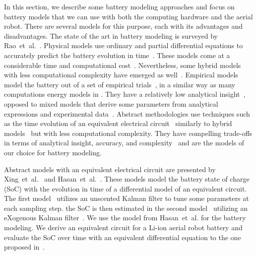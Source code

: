 In this section, we describe some battery modeling approaches and focus on battery models that we can use with both the computing hardware and the aerial robot. There are several models for this purpose, each with its advantages and disadvantages. The state of the art in battery modeling is surveyed by Rao~et~al.~\citep{rao2003battery}.
Physical models use ordinary and partial differential equations to accurately predict the battery evolution in time~\citep{rao2003battery}. These models come at a considerable time and computational cost~\citep{doyle1993modeling,marcicki2013design,lotfi2017reduced,moura2017battery}. Nevertheless, some hybrid models with less computational complexity have emerged as well~\citep{kim2011hybrid,kim2019enhanced}. Empirical models model the battery out of a set of empirical trials~\citep{syracuse1997statistical,pedram1999design}, in a similar way as many computations energy models in . They have a relatively low analytical insight~\citep{rao2003battery}, opposed to mixed models that derive some parameters from analytical expressions and experimental data~\citep{rao2003battery,rakhmatov2001analytical}. Abstract methodologies use techniques such as the time evolution of an equivalent electrical circuit~\citep{gold1997pspice,benini2001discrete,seongjun2008state,xiaosong2012comparative,xing2014state,hasan2018exogenous} similarly to hybrid models~\citep{kim2011hybrid} but with less computational complexity. They have compelling trade-offs in terms of analytical insight, accuracy, and complexity~\citep{rao2003battery} and are the models of our choice for battery modeling.

Abstract models with an equivalent electrical circuit are presented by Xing~et~al.~\citep{xing2014state} and Hasan~et~al.~\citep{hasan2018exogenous}. These models model the battery state of charge (SoC) with the evolution in time of a differential model of an equivalent circuit. The first model~\citep{xing2014state} utilizes an unscented Kalman filter to tune some parameters at each sampling step. the SoC is then estimated in the second model~\citep{hasan2018exogenous} utilizing an eXogenous Kalman filter~\citep{johansen2017exogenous}. We use the model from Hasan~et~al. for the battery modeling. We derive an equivalent circuit for a Li-ion aerial robot battery and evaluate the SoC over time with an equivalent differential equation to the one proposed in~\citep{hasan2018exogenous}. 

